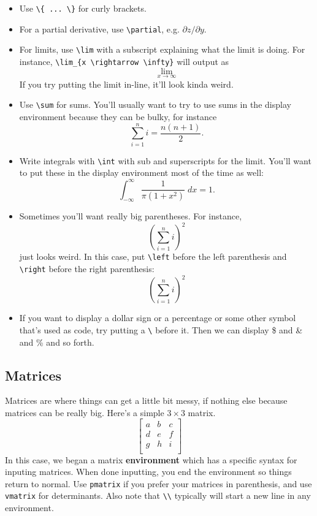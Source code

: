 \documentclass[12pt]{article}
\begin{document}
\begin{itemize}
		\item Use \verb|\{ ... \}| for curly brackets. 
		
		\item For a partial derivative, use \verb|\partial|, e.g. $\partial z/\partial y$. 
		
		\item For limits, use \verb|\lim| with a subscript explaining what the limit is 
		doing. For instance, \verb|\lim_{x \rightarrow \infty}| will output as
				\[ \lim_{x \rightarrow \infty}  \]
		If you try putting the limit in-line, it'll look kinda weird. 
		
		\item Use \verb|\sum| for sums. You'll usually want to try to use sums in the 
		display environment because they can be bulky, for instance
			\[\sum_{i=1}^n i = \frac{n(n+1)}{2}.\]
			
		\item Write integrals with \verb|\int| with sub and superscripts for the limit. 
		You'll want to put these in the display environment most of the time as well:
			\[ \int_{-\infty}^{\infty} \frac{1}{\pi(1+x^2)} \; dx = 1 .\]
			
		\item Sometimes you'll want really big parentheses. For instance,
				\[ ( \sum_{i=1}^n i)^2	\]
			just looks weird. In this case, put \verb|\left| before the left parenthesis 
			and \verb|\right| before the right parenthesis:
				\[ \left( \sum_{i=1}^n i \right)^2	\]
				
		\item If you want to display a dollar sign or a percentage or some other symbol 
		that's used as code, try putting a \verb|\| before it. Then we can display \$ 
		and \& and \% and so forth.
	\end{itemize}
	
	
\subsection{Matrices}

Matrices are where things can get a little bit messy, if nothing else because matrices 
can be really big. Here's a simple $3 \times 3$ matrix. 
\[
	\begin{bmatrix}
		a	&	b	&	c	\\
		d	&	e	&	f	\\
		g	&	h	&	i	\\
	\end{bmatrix}
\]
In this case, we began a matrix \textbf{environment} which has a specific syntax for 
inputing matrices. When done inputting, you end the environment so things return to 
normal. Use \verb|pmatrix| if you prefer your matrices in parenthesis, and use 
\verb|vmatrix| for determinants. Also note that \verb|\\| typically will start a new 
line in any environment.
\end{document}

